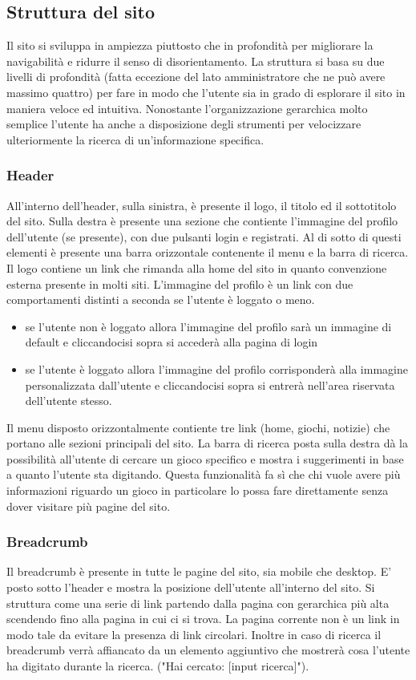 \subsection{Struttura del sito}

Il sito si sviluppa in ampiezza piuttosto che in profondità per migliorare la navigabilità e ridurre il senso di disorientamento. La struttura si basa su due livelli di profondità (fatta eccezione del lato amministratore che ne può avere massimo quattro) per fare in modo che l'utente sia in grado di esplorare il sito in maniera veloce ed intuitiva. Nonostante l'organizzazione gerarchica molto semplice l'utente ha anche a disposizione degli strumenti per velocizzare ulteriormente la ricerca di un'informazione specifica.

\subsubsection{Header}
All'interno dell'header, sulla sinistra, è presente il logo, il titolo ed il sottotitolo del sito. Sulla destra è presente una sezione che contiente l'immagine del profilo dell'utente (se presente), con due pulsanti login e registrati. Al di sotto di questi elementi è presente una barra orizzontale contenente il menu e la barra di ricerca.
Il logo contiene un link che rimanda alla home del sito in quanto convenzione esterna presente in molti siti.
L'immagine del profilo è un link con due comportamenti distinti a seconda se l'utente è loggato o meno.
\begin{itemize}
	\item se l'utente non è loggato allora l'immagine del profilo sarà un immagine di default e cliccandocisi sopra si accederà alla pagina di login
	\item se l'utente è loggato allora l'immagine del profilo corrisponderà alla immagine personalizzata dall'utente e cliccandocisi sopra si entrerà nell'area riservata dell'utente stesso.   
\end{itemize}


Il menu disposto orizzontalmente contiente tre link (home, giochi, notizie) che portano alle sezioni principali del sito.
La barra di ricerca posta sulla destra dà la possibilità all'utente di cercare un gioco specifico e mostra i suggerimenti in base a quanto l'utente sta digitando. Questa funzionalità fa sì che chi vuole avere più informazioni riguardo un gioco in particolare lo possa fare direttamente senza dover visitare più pagine del sito.

\subsubsection{Breadcrumb}
Il breadcrumb è presente in tutte le pagine del sito, sia mobile che desktop.
E' posto sotto l'header e mostra la posizione dell'utente all'interno del sito. Si struttura come una serie di link partendo dalla pagina con gerarchica più alta scendendo fino alla pagina in cui ci si trova. La pagina corrente non è un link in modo tale da evitare la presenza di link circolari.
Inoltre in caso di ricerca il breadcrumb verrà affiancato da un elemento aggiuntivo che mostrerà cosa l'utente ha digitato durante la ricerca. ("Hai cercato: [input ricerca]").


